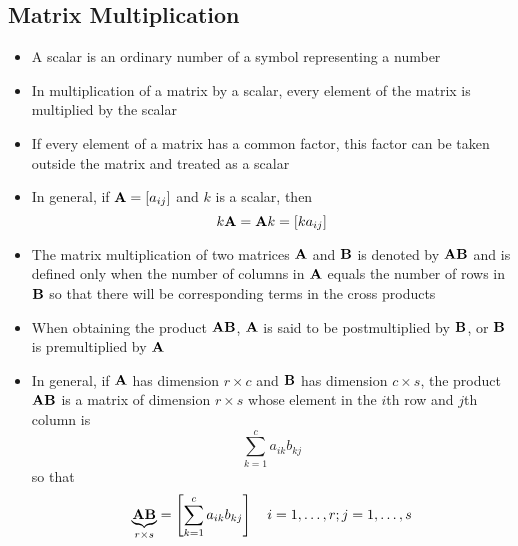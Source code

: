 \subsection{Matrix Multiplication}
\begin{itemize}
\item A scalar is an ordinary number of a symbol representing a number 
\item In multiplication of a matrix by a scalar, every element of the matrix is multiplied by the scalar
\item If every element of a matrix has a common factor, this factor can be taken outside the matrix and treated as a scalar 
\item In general, if $\mathbf{A} = [a_{ij}]$ and $k$ is a scalar, then $$ k\mathbf{A} = \mathbf{A}k = [ka_{ij}] $$ 
\item The matrix multiplication of two matrices $\mathbf{A}$ and $\mathbf{B}$ is denoted by $\mathbf{AB}$ and is defined only when the number of columns in $\mathbf{A}$ equals the number of rows in $\mathbf{B}$ so that there will be corresponding terms in the cross products 
\item When obtaining the product $\mathbf{AB}$, $\mathbf{A}$ is said to be postmultiplied by $\mathbf{B}$, or $\mathbf{B}$ is premultiplied by $\mathbf{A}$
\item In general, if $\mathbf{A}$ has dimension $r \times c$ and $\mathbf{B}$ has dimension $c \times s$, the product $\mathbf{AB}$ is a matrix of dimension $r \times s$ whose element in the $i$th row and $j$th column is $$ \sum_{k=1}^c a_{ik}b_{kj} $$ so that $$ \underbrace{\mathbf{AB}}_{r \times s} = \left[ \sum_{k=1}^c a_{ik}b_{kj} \right] ~~~ i = 1,\dots,r; j = 1,\dots,s $$ 
\end{itemize} 


